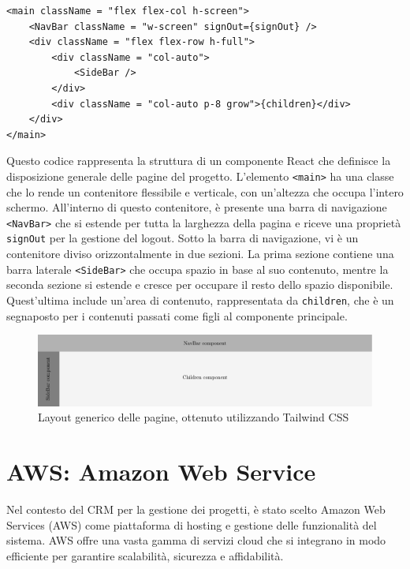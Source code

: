 \documentclass[target=bach,aauheader=,style=]{thud}
\begin{document}
\begin{lstlisting}[caption=Parte del file \texttt{app.tsx} del CRM]
<main className = "flex flex-col h-screen">
    <NavBar className = "w-screen" signOut={signOut} />
    <div className = "flex flex-row h-full">
        <div className = "col-auto">
            <SideBar />
        </div>
        <div className = "col-auto p-8 grow">{children}</div>
    </div>
</main> 
\end{lstlisting}

\noindent Questo codice rappresenta la struttura di un componente React che definisce la disposizione generale delle pagine del progetto. L'elemento \texttt{<main>} ha una classe che lo rende un contenitore flessibile e verticale, con un'altezza che occupa l'intero schermo. All'interno di questo contenitore, è presente una barra di navigazione \texttt{<NavBar>} che si estende per tutta la larghezza della pagina e riceve una proprietà \texttt{signOut} per la gestione del logout. Sotto la barra di navigazione, vi è un contenitore diviso orizzontalmente in due sezioni. La prima sezione contiene una barra laterale \texttt{<SideBar>} che occupa spazio in base al suo contenuto, mentre la seconda sezione si estende e cresce per occupare il resto dello spazio disponibile. Quest'ultima include un'area di contenuto, rappresentata da \texttt{{children}}, che è un segnaposto per i contenuti passati come figli al componente principale.

\begin{figure}[H]
    \centering
    \includegraphics[width=1\textwidth]{img/layout.pdf} 
    \caption{Layout generico delle pagine, ottenuto utilizzando Tailwind CSS}
\end{figure}


\section{AWS: Amazon Web Service}
Nel contesto del CRM per la gestione dei progetti, è stato scelto Amazon Web Services (AWS) \cite{mathew2014overview} come piattaforma di hosting e gestione delle funzionalità del sistema. AWS offre una vasta gamma di servizi cloud che si integrano in modo efficiente per garantire scalabilità, sicurezza e affidabilità.
\end{document}
